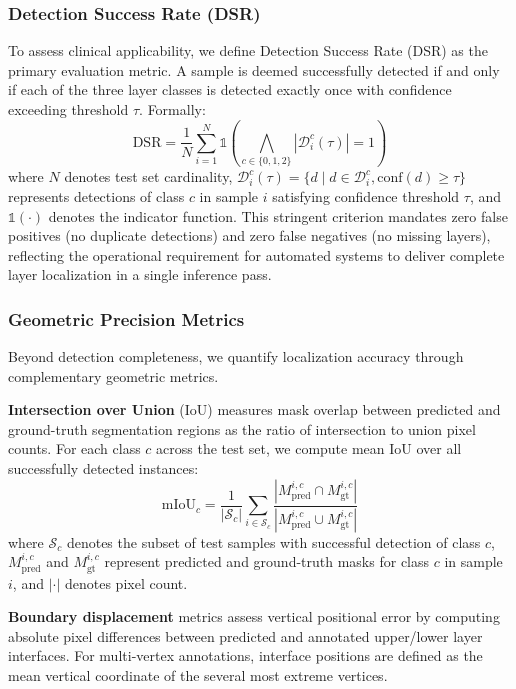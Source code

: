 \documentclass[journal,twoside,web]{ieeecolor}
\begin{document}
\subsubsection{Detection Success Rate (DSR)} To assess clinical applicability, we define Detection Success Rate (DSR) as the primary evaluation metric. A sample is deemed successfully detected if and only if each of the three layer classes is detected exactly once with confidence exceeding threshold $\tau$. Formally:
\begin{equation}
\text{DSR} = \frac{1}{N}\sum_{i=1}^{N}\mathbb{1}\left(\bigwedge_{c \in \{0,1,2\}} |\mathcal{D}_i^c(\tau)| = 1\right)
\end{equation}
where $N$ denotes test set cardinality, $\mathcal{D}_i^c(\tau) = \{d \mid d \in \mathcal{D}_i^c, \text{conf}(d) \geq \tau\}$ represents detections of class $c$ in sample $i$ satisfying confidence threshold $\tau$, and $\mathbb{1}(\cdot)$ denotes the indicator function. This stringent criterion mandates zero false positives (no duplicate detections) and zero false negatives (no missing layers), reflecting the operational requirement for automated systems to deliver complete layer localization in a single inference pass.

\subsubsection{Geometric Precision Metrics} Beyond detection completeness, we quantify localization accuracy through complementary geometric metrics. 

\textbf{Intersection over Union} (IoU) measures mask overlap between predicted and ground-truth segmentation regions as the ratio of intersection to union pixel counts. For each class $c$ across the test set, we compute mean IoU over all successfully detected instances:
\begin{equation}
\text{mIoU}_c = \frac{1}{|\mathcal{S}_c|} \sum_{i \in \mathcal{S}_c} \frac{|M_{\text{pred}}^{i,c} \cap M_{\text{gt}}^{i,c}|}{|M_{\text{pred}}^{i,c} \cup M_{\text{gt}}^{i,c}|}
\end{equation}
where $\mathcal{S}_c$ denotes the subset of test samples with successful detection of class $c$, $M_{\text{pred}}^{i,c}$ and $M_{\text{gt}}^{i,c}$ represent predicted and ground-truth masks for class $c$ in sample $i$, and $|\cdot|$ denotes pixel count. 

\textbf{Boundary displacement} metrics assess vertical positional error by computing absolute pixel differences between predicted and annotated upper/lower layer interfaces. For multi-vertex annotations, interface positions are defined as the mean vertical coordinate of the several most extreme vertices.
\end{document}
